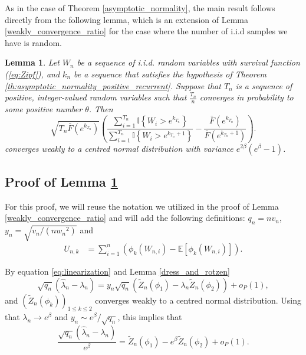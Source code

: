 \documentclass[sn-mathphys-ay]{sn-jnl}%
\newtheorem{lemma}{Lemma}[section]
\newcommand{\E}{\mathbb{E}}
\begin{document}
\begin{appendices}
As in the case of Theorem \ref{asymptotic_normality}, the main result follows
directly from the following lemma, which is an extension of Lemma
\ref{weakly_convergence_ratio} for the case where the number of i.i.d samples we have
is random.

\begin{lemma}\label{lemma:dress_and_rotzen} Let \(W_n\) be a sequence of i.i.d. random variables with survival
    function (\ref{eq:Zipf}), and $k_n$ be a sequence that satisfies the hypothesis of Theorem \ref{th:asymptotic_normality_positive_recurrent}.
    Suppose that $T_n$ is a sequence of positive, integer-valued random variables such that
    $\frac{T_n}{n}$ converges in probability to some positive number $\theta$. Then
    \begin{equation*}
        \sqrt {T_n\bar F\left( {{e^{{k_{T_n}}}}} \right)} \left( {\frac{{\sum\limits_{i = 1}^{T_n} {\mathbb{I}\left\{ {{W_i} > {e^{{k_{T_n}}}}} \right\}} }}{{\sum\limits_{i = 1}^{T_n} {\mathbb{I}\left\{ {{W_i} > {e^{{k_{T_n}} + 1}}} \right\}} }} - \frac{{\bar F\left( {{e^{{k_{T_n}}}}} \right)}}{{\bar F\left( {{e^{{k_{T_n}} + 1}}} \right)}}} \right).
    \end{equation*}
    converges weakly to a centred normal distribution with variance \({e^{2\beta
                }}\left( {{e^\beta } - 1} \right)\). %
\end{lemma}

\subsection{Proof of Lemma \ref{lemma:dress_and_rotzen}}

For this proof, we will reuse the notation we utilized in the proof of Lemma
\ref{weakly_convergence_ratio} and will add the following definitions: $q_n =nv_n$,
${y_n} = \sqrt {{{{v_n}}}/{{(n{w_n}^2)}}}$ and
\begin{align*}
    U_{n,k} & =\sum\limits_{i = 1}^n {\left( {{\phi _k}\left( {{W_{n,i}}} \right) - \E\left[{\phi _k}\left( {{W_{n,i}}} \right)\right]} \right)}.
\end{align*}

By equation \eqref{eq:linearization} and Lemma \ref{dress_and_rotzen}
\begin{equation*}
    \sqrt{q_n}\left({\widehat \lambda _n} - {\lambda _n}\right) ={y_n}\sqrt{q_n}\left( {{{\widetilde Z}_n}\left( {{\phi _1}} \right) - {\lambda _n}{{\widetilde Z}_n}\left( {{\phi _2}} \right)} \right) + {o_P}\left( 1\right),
\end{equation*}
and \({( {{{\widetilde Z}_n}\left( {{\phi _k}} \right)} )_{1 \leqslant k
                \leqslant 2}}\) converges weakly to a centred normal distribution. Using that
$\lambda_n\to e^\beta$ and $y_n\sim{e^\beta}/{\sqrt{q_n}}$, this implies that
\begin{equation}
    \frac{\sqrt{q_n}\left({\widehat \lambda _n} - {\lambda _n}\right)}{e^\beta} = {{{\widetilde Z}_n}\left( {{\phi _1}} \right) - e^\beta{{\widetilde Z}_n}\left( {{\phi _2}} \right)} + {o_P}\left( 1\right).
\end{equation}


\end{appendices}
\end{document}
